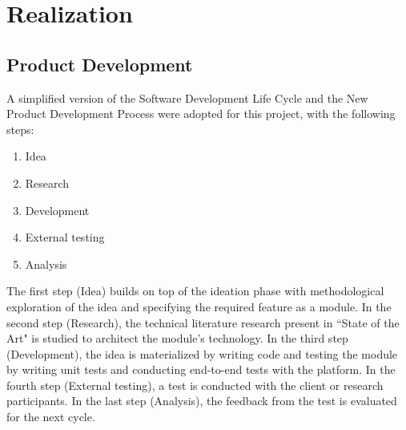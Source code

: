 \documentclass{article}
\begin{document}
\newpage

\section{Realization}

\subsection{Product Development}

A simplified version of the Software Development Life Cycle and the New Product Development Process were adopted for this project, with the following steps:

\begin{enumerate}
	\item Idea
	\item Research
	\item Development
	\item External testing
	\item Analysis
\end{enumerate}

The first step (Idea) builds on top of the ideation phase with methodological exploration of the idea and specifying the required feature as a module. In the second step (Research), the technical literature research present in ``State of the Art" is studied to architect the module's technology. In the third step (Development), the idea is materialized by writing code and testing the module by writing unit tests and conducting end-to-end tests with the platform. In the fourth step (External testing), a test is conducted with the client or research participants. In the last step (Analysis), the feedback from the test is evaluated for the next cycle.
\end{document}
